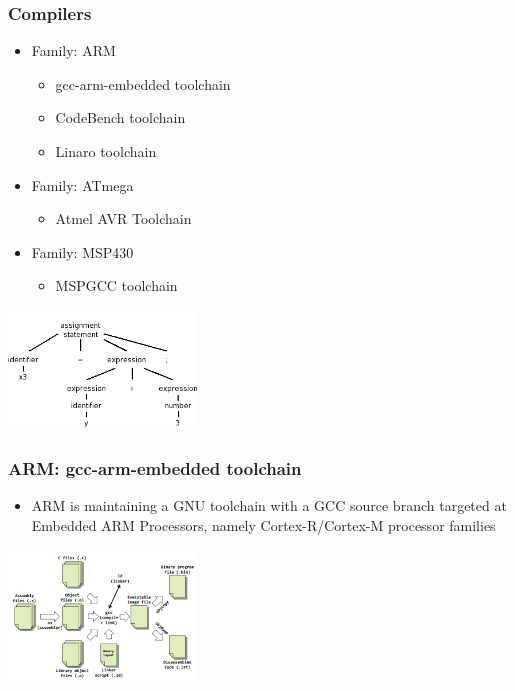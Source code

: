 \documentclass{beamer}
\begin{document}
\begin{frame}
	\frametitle{Compilers}
	\vspace{.1cm}
	\begin{itemize}
		\justifying
		\item Family: ARM
		\begin{itemize}
			\item gcc-arm-embedded toolchain
			\item CodeBench toolchain
			\item Linaro toolchain
		\end{itemize}
		\item Family: ATmega
		\begin{itemize}
			\item Atmel AVR Toolchain
		\end{itemize}
		\item Family: MSP430
		\begin{itemize}
			\item MSPGCC toolchain
		\end{itemize}
	\end{itemize}
	\vspace{.5cm}
	\hspace*{5.5cm} \includegraphics[width=5cm]{figs/parse-tree.png}
\end{frame}

\begin{frame}
	\frametitle{ARM: gcc-arm-embedded toolchain}
	\vspace{.1cm}
		\begin{itemize}
			\justifying
			\item ARM is maintaining a GNU toolchain with a GCC source branch targeted at Embedded ARM Processors, namely Cortex-R/Cortex-M processor families	
		\end{itemize}
	\vspace{.5cm}
	\hspace*{5.5cm} \includegraphics[width=5cm]{figs/CompilerAssemblerToolchain_gcc.png}
\end{frame}
\end{document}
